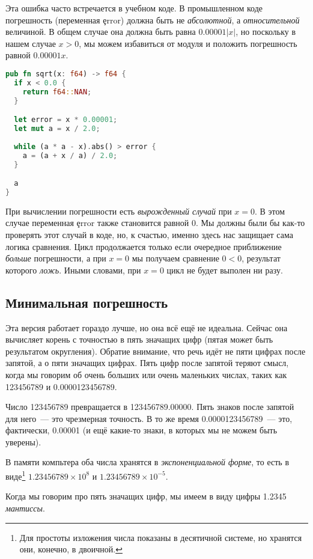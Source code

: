Эта ошибка часто встречается в учебном коде.
В промышленном коде погрешность (переменная \c{error}) должна быть не {\em абсолютной}, а {\em относительной} величиной.
В общем случае она должна быть равна $0.00001 |x|$, но поскольку в нашем случае $x > 0$, мы можем избавиться от модуля и положить погрешность равной $0.00001 x$.

\begin{lstlisting}[language=Rust]
pub fn sqrt(x: f64) -> f64 {
  if x < 0.0 {
    return f64::NAN;
  }

  let error = x * 0.00001;
  let mut a = x / 2.0;
  
  while (a * a - x).abs() > error {
    a = (a + x / a) / 2.0;
  }

  a
}
\end{lstlisting}

При вычислении погрешности есть {\em вырожденный случай} при $x = 0$.
В этом случае переменная \c{error} также становится равной 0.
Мы должны были бы как-то проверять этот случай в коде, но, к счастью, именно здесь нас защищает сама логика сравнения.
Цикл продолжается только если очередное приближение {\em больше} погрешности, а при $x = 0$ мы получаем сравнение $0 < 0$, результат которого {\em ложь}.
Иными словами, при $x = 0$ цикл не будет выполен ни разу.

\subsection{Минимальная погрешность}

Эта версия работает гораздо лучше, но она всё ещё не идеальна.
Сейчас она вычисляет корень с точностью в пять значащих цифр (пятая может быть результатом округления).
Обратие внимание, что речь идёт не пяти цифрах после запятой, а о пяти значащих цифрах.
Пять цифр после запятой теряют смысл, когда мы говорим об очень больших или очень маленьких числах, таких как 123456789 и 0.0000123456789.

Число 123456789 превращается в 123456789.00000.
Пять знаков после запятой для него~--- это чрезмерная точность.
В то же время 0.0000123456789~--- это, фактически, 0.00001 (и ещё какие-то знаки, в которых мы не можем быть уверены).

В памяти компьтера оба числа хранятся в {\em экспоненциальной форме}, то есть в виде\footnote{
  Для простоты изложения числа показаны в десятичной системе, но хранятся они, конечно, в двоичной.
} $1.23456789\times 10^8$ и $1.23456789\times 10^{-5}$.

Когда мы говорим про пять значащих цифр, мы имеем в виду цифры 1.2345 {\em мантиссы}.

